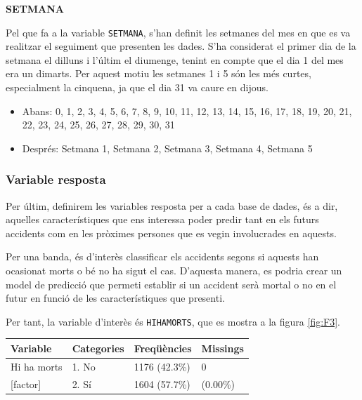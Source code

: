 \documentclass[12pt,longbibliography]{article}
\theoremstyle{definition}
\theoremstyle{remark}
\begin{document}
\textbf{SETMANA}


Pel que fa a la variable \texttt{SETMANA}, s'han definit les setmanes del mes en que es va realitzar el seguiment que presenten les dades. S'ha considerat el primer dia de la setmana el dilluns i l'últim el diumenge, tenint en compte que el dia 1 del mes era un dimarts. Per aquest motiu les setmanes 1 i 5 són les més curtes, especialment la cinquena, ja que el dia 31 va caure en dijous.


\begin{itemize}

\item Abans: 0, 1, 2, 3, 4, 5, 6, 7, 8, 9, 10, 11, 12, 13, 14, 15, 16, 17, 18, 19, 20, 21, 22, 23, 24, 25, 26, 27, 28, 29, 30, 31

\item Després: Setmana 1, Setmana 2, Setmana 3, Setmana 4, Setmana 5

\end{itemize}


\subsubsection{Variable resposta}

Per últim, definirem les variables resposta per a cada base de dades, és a dir, aquelles característiques que ens interessa poder predir tant en els futurs accidents com en les pròximes persones que es vegin involucrades en aquests.


Per una banda, és d'interès classificar els accidents segons si aquests han ocasionat morts o bé no ha sigut el cas. D'aquesta manera, es podria crear un model de predicció que permeti establir si un accident serà mortal o no en el futur en funció de les característiques que presenti.


Per tant, la variable d'interès és \texttt{HIHAMORTS}, que es mostra a la figura \ref{fig:F3}.

\begin{table}[H]
\centering
\begin{tabular}{llll}
\hline
Variable         & Categories  & Freqüències   & Missings \\ \hline
Hi ha morts & 1. No & 1176 (42.3\%) & 0        \\
{[}factor{]}     & 2. Sí      & 1604 (57.7\%) & (0.00\%) \\ \hline
\end{tabular}
\end{table}
\end{document}
